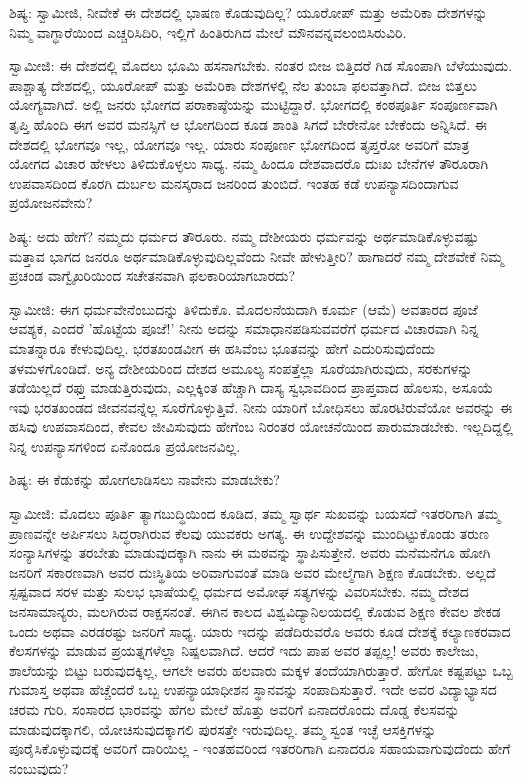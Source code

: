 ಶಿಷ್ಯ: ಸ್ವಾಮೀಜಿ, ನೀವೇಕೆ ಈ ದೇಶದಲ್ಲಿ ಭಾಷಣ ಕೊಡುವುದಿಲ್ಲ? ಯೂರೋಪ್ ಮತ್ತು ಅಮೆರಿಕಾ ದೇಶಗಳನ್ನು ನಿಮ್ಮ ವಾಗ್ಧಾರೆಯಿಂದ ಎಚ್ಚರಿಸಿದಿರಿ, ಇಲ್ಲಿಗೆ ಹಿಂತಿರುಗಿದ ಮೇಲೆ ಮೌನವನ್ನವಲಂಬಿಸಿರುವಿರಿ.

ಸ್ವಾಮೀಜಿ: ಈ ದೇಶದಲ್ಲಿ ಮೊದಲು ಭೂಮಿ ಹಸನಾಗಬೇಕು. ನಂತರ ಬೀಜ ಬಿತ್ತಿದರೆ ಗಿಡ ಸೊಂಪಾಗಿ ಬೆಳೆಯುವುದು. ಪಾಶ್ಚಾತ್ಯ ದೇಶದಲ್ಲಿ, ಯೂರೋಪ್ ಮತ್ತು ಅಮೆರಿಕಾ ದೇಶಗಳಲ್ಲಿ ನೆಲ ತುಂಬಾ ಫಲವತ್ತಾಗಿದೆ. ಬೀಜ ಬಿತ್ತಲು ಯೋಗ್ಯವಾಗಿದೆ. ಅಲ್ಲಿ ಜನರು ಭೋಗದ ಪರಾಕಾಷ್ಠೆಯನ್ನು ಮುಟ್ಟಿದ್ದಾರೆ. ಭೋಗದಲ್ಲಿ ಕಂಠಪೂರ್ತಿ ಸಂಪೂರ್ಣವಾಗಿ ತೃಪ್ತಿ ಹೊಂದಿ ಈಗ ಅವರ ಮನಸ್ಸಿಗೆ ಆ ಭೋಗದಿಂದ ಕೂಡ ಶಾಂತಿ ಸಿಗದೆ ಬೇರೇನೋ ಬೇಕೆಂದು ಅನ್ನಿಸಿದೆ. ಈ ದೇಶದಲ್ಲಿ ಭೋಗವೂ ಇಲ್ಲ, ಯೋಗವೂ ಇಲ್ಲ. ಯಾರು ಸಂಪೂರ್ಣ ಭೋಗದಿಂದ ತೃಪ್ತರೋ ಅವರಿಗೆ ಮಾತ್ರ ಯೋಗದ ವಿಚಾರ ಹೇಳಲು ತಿಳಿದುಕೊಳ್ಳಲು ಸಾಧ್ಯ. ನಮ್ಮ ಹಿಂದೂ ದೇಶವಾದರೊ ದುಃಖ ಬೇನೆಗಳ ತೌರೂರಾಗಿ ಉಪವಾಸದಿಂದ ಕೊರಗಿ ದುರ್ಬಲ ಮನಸ್ಕರಾದ ಜನರಿಂದ ತುಂಬಿದೆ. ಇಂತಹ ಕಡೆ ಉಪನ್ಯಾಸದಿಂದಾಗುವ ಪ್ರಯೋಜನವೇನು?

ಶಿಷ್ಯ: ಅದು ಹೇಗೆ? ನಮ್ಮದು ಧರ್ಮದ ತೌರೂರು. ನಮ್ಮ ದೇಶೀಯರು ಧರ್ಮವನ್ನು ಅರ್ಥಮಾಡಿಕೊಳ್ಳುವಷ್ಟು ಮತ್ತಾವ ಭಾಗದ ಜನರೂ ಅರ್ಥಮಾಡಿಕೊಳ್ಳುವುದಿಲ್ಲವೆಂದು ನೀವೇ ಹೇಳುತ್ತೀರಿ? ಹಾಗಾದರೆ ನಮ್ಮ ದೇಶವೇಕೆ ನಿಮ್ಮ ಪ್ರಚಂಡ ವಾಗ್ವೈಖರಿಯಿಂದ ಸಚೇತನವಾಗಿ ಫಲಕಾರಿಯಾಗಬಾರದು?

ಸ್ವಾಮೀಜಿ: ಈಗ ಧರ್ಮವೇನೆಂಬುದನ್ನು ತಿಳಿದುಕೊ. ಮೊದಲನೆಯದಾಗಿ ಕೂರ್ಮ (ಆಮೆ) ಅವತಾರದ ಪೂಜೆ ಆವಶ್ಯಕ, ಎಂದರೆ 'ಹೊಟ್ಟೆಯ ಪೂಜೆ!' ನೀನು ಅದನ್ನು ಸಮಾಧಾನಪಡಿಸುವವರೆಗೆ ಧರ್ಮದ ವಿಚಾರವಾಗಿ ನಿನ್ನ ಮಾತನ್ನಾರೂ ಕೇಳುವುದಿಲ್ಲ. ಭರತಖಂಡವೀಗ ಈ ಹಸಿವೆಂಬ ಭೂತವನ್ನು ಹೇಗೆ ಎದುರಿಸುವುದೆಂದು ತಳಮಳಗೊಂಡಿದೆ. ಅನ್ಯ ದೇಶೀಯರಿಂದ ದೇಶದ ಅಮೂಲ್ಯ ಸಂಪತ್ತೆಲ್ಲಾ ಸೂರೆಯಾಗಿರುವುದು, ಸರಕುಗಳನ್ನು ತಡೆಯಿಲ್ಲದೆ ರಫ್ತು ಮಾಡುತ್ತಿರುವುದು, ಎಲ್ಲಕ್ಕಿಂತ ಹೆಚ್ಚಾಗಿ ದಾಸ್ಯ ಸ್ವಭಾವದಿಂದ ಪ್ರಾಪ್ತವಾದ ಹೊಲಸು, ಅಸೂಯೆ ಇವು ಭರತಖಂಡದ ಜೀವನವನ್ನೆಲ್ಲ ಸೂರೆಗೊಳ್ಳುತ್ತಿವೆ. ನೀನು ಯಾರಿಗೆ ಬೋಧಿಸಲು ಹೊರಟಿರುವೆಯೋ ಅವರನ್ನು ಈ ಹಸಿವು ಉಪವಾಸದಿಂದ, ಕೇವಲ ಜೀವಿಸುವುದು ಹೇಗೆಂಬ ನಿರಂತರ ಯೋಚನೆಯಿಂದ ಪಾರುಮಾಡಬೇಕು. ಇಲ್ಲದಿದ್ದಲ್ಲಿ ನಿನ್ನ ಉಪನ್ಯಾಸಗಳಿಂದ ಏನೊಂದೂ ಪ್ರಯೋಜನವಿಲ್ಲ.

ಶಿಷ್ಯ: ಈ ಕೆಡುಕನ್ನು ಹೋಗಲಾಡಿಸಲು ನಾವೇನು ಮಾಡಬೇಕು?

ಸ್ವಾಮೀಜಿ: ಮೊದಲು ಪೂರ್ತಿ ತ್ಯಾಗಬುದ್ಧಿಯಿಂದ ಕೂಡಿದ, ತಮ್ಮ ಸ್ವಾರ್ಥ ಸುಖವನ್ನು ಬಯಸದೆ ಇತರರಿಗಾಗಿ ತಮ್ಮ ಪ್ರಾಣವನ್ನೇ ಅರ್ಪಿಸಲು ಸಿದ್ಧರಾಗಿರುವ ಕೆಲವು ಯುವಕರು ಅಗತ್ಯ. ಈ ಉದ್ದೇಶವನ್ನು ಮುಂದಿಟ್ಟುಕೊಂಡು ತರುಣ ಸಂನ್ಯಾಸಿಗಳನ್ನು ತರಬೇತು ಮಾಡುವುದಕ್ಕಾಗಿ ನಾನು ಈ ಮಠವನ್ನು ಸ್ಥಾಪಿಸುತ್ತೇನೆ. ಅವರು ಮನೆಮನೆಗೂ ಹೋಗಿ ಜನರಿಗೆ ಸಕಾರಣವಾಗಿ ಅವರ ದುಃಸ್ಥಿತಿಯ ಅರಿವಾಗುವಂತೆ ಮಾಡಿ ಅವರ ಮೇಲ್ಮೆಗಾಗಿ ಶಿಕ್ಷಣ ಕೊಡಬೇಕು. ಅಲ್ಲದೆ ಸ್ಪಷ್ಟವಾದ ಸರಳ ಮತ್ತು ಸುಲಭ ಭಾಷೆಯಲ್ಲಿ ಧರ್ಮದ ಅಮೋಘ ಸತ್ಯಗಳನ್ನು ವಿವರಿಸಬೇಕು. ನಮ್ಮ ದೇಶದ ಜನಸಾಮಾನ್ಯರು, ಮಲಗಿರುವ ರಾಕ್ಷಸನಂತೆ. ಈಗಿನ ಕಾಲದ ವಿಶ್ವವಿದ್ಯಾನಿಲಯದಲ್ಲಿ ಕೊಡುವ ಶಿಕ್ಷಣ ಕೇವಲ ಶೇಕಡ ಒಂದು ಅಥವಾ ಎರಡರಷ್ಟು ಜನರಿಗೆ ಸಾಧ್ಯ. ಯಾರು ಇದನ್ನು ಪಡೆದಿರುವರೊ ಅವರು ಕೂಡ ದೇಶಕ್ಕೆ ಕಲ್ಯಾಣಕರವಾದ ಕೆಲಸಗಳನ್ನು ಮಾಡುವ ಪ್ರಯತ್ನಗಳೆಲ್ಲಾ ನಿಷ್ಪಲವಾಗಿದೆ. ಆದರೆ ಇದು ಪಾಪ ಅವರ ತಪ್ಪಲ್ಲ! ಅವರು ಕಾಲೇಜು, ಶಾಲೆಯನ್ನು ಬಿಟ್ಟು ಬರುವುದಕ್ಕಿಲ್ಲ, ಆಗಲೇ ಅವರು ಹಲವಾರು ಮಕ್ಕಳ ತಂದೆಯಾಗಿರುತ್ತಾರೆ. ಹೇಗೋ ಕಷ್ಟಪಟ್ಟು ಒಬ್ಬ ಗುಮಾಸ್ತ ಅಥವಾ ಹೆಚ್ಚೆಂದರೆ ಒಬ್ಬ ಉಪನ್ಯಾಯಾಧೀಶನ ಸ್ಥಾನವನ್ನು ಸಂಪಾದಿಸುತ್ತಾರೆ. ಇದೇ ಅವರ ವಿದ್ಯಾಭ್ಯಾಸದ ಚರಮ ಗುರಿ. ಸಂಸಾರದ ಭಾರವನ್ನು ಹೆಗಲ ಮೇಲೆ ಹೊತ್ತು ಅವರಿಗೆ ಏನಾದರೊಂದು ದೊಡ್ಡ ಕೆಲಸವನ್ನು ಮಾಡುವುದಕ್ಕಾಗಲಿ, ಯೋಚಿಸುವುದಕ್ಕಾಗಲಿ ಪುರಸತ್ತೇ ಇರುವುದಿಲ್ಲ. ತಮ್ಮ ಸ್ವಂತ ಇಚ್ಛೆ ಆಸಕ್ತಿಗಳನ್ನು ಪೂರೈಸಿಕೊಳ್ಳುವುದಕ್ಕೆ ಅವರಿಗೆ ದಾರಿಯಿಲ್ಲ - ಇಂತಹವರಿಂದ ಇತರರಿಗಾಗಿ ಏನಾದರೂ ಸಹಾಯವಾಗುವುದೆಂದು ಹೇಗೆ ನಂಬುವುದು?

